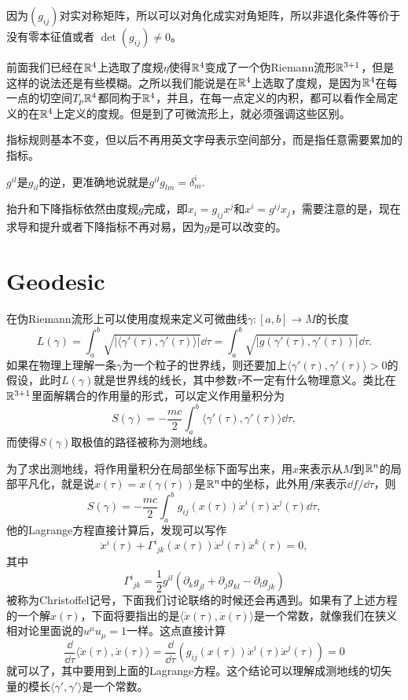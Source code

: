 因为$(g_{ij})$对实对称矩阵，所以可以对角化成实对角矩阵，所以非退化条件等价于没有零本征值或者
$\det (g_{ij})\neq 0$。

前面我们已经在$\mathbb{R}^4$上选取了度规$\eta$使得$\mathbb{R}^4$变成了一个伪Riemann流形$\mathbb{R}^{3+1}$，但是这样的说法还是有些模糊。之所以我们能说是在$\mathbb{R}^4$上选取了度规，是因为$\mathbb{R}^4$在每一点的切空间$T_p\mathbb{R}^4$都同构于$\mathbb{R}^4$，并且，在每一点定义的内积，都可以看作全局定义的在$\mathbb{R}^4$上定义的度规。但是到了可微流形上，就必须强调这些区别。

指标规则基本不变，但以后不再用英文字母表示空间部分，而是指任意需要累加的指标。

$g^{il}$是$g_{il}$的逆，更准确地说就是$g^{il}g_{lm}=\delta^i_m$.

抬升和下降指标依然由度规$g$完成，即$x_i=g_{ij}x^j$和$x^i=g^{ij}x_j$，需要注意的是，现在求导和提升或者下降指标不再对易，因为$g$是可以改变的。
\section{Geodesic}
在伪Riemann流形上可以使用度规来定义可微曲线$\gamma:[a,b]\to M$的长度
\[
	L(\gamma)=\int_a^b \sqrt{|\langle\gamma'(\tau),\gamma'(\tau)\rangle|}\dd \tau=\int_a^b \sqrt{|g(\gamma'(\tau),\gamma'(\tau))|}\dd \tau.
\]
如果在物理上理解一条$\gamma$为一个粒子的世界线，则还要加上$\langle\gamma'(\tau),\gamma'(\tau)\rangle>0$的假设，此时$L(\gamma)$就是世界线的线长，其中参数$\tau$不一定有什么物理意义。类比在$\mathbb{R}^{3+1}$里面解耦合的作用量的形式，可以定义作用量积分为
\[
	S(\gamma)=-\frac{mc}{2}\int_a^b \langle\gamma'(\tau),\gamma'(\tau)\rangle\dd \tau,
\]
而使得$S(\gamma)$取极值的路径被称为测地线。

为了求出测地线，将作用量积分在局部坐标下面写出来，用$x$来表示从$M$到$\mathbb{R}^n$的局部平凡化，就是说$x(\tau)=x(\gamma(\tau))$是$\mathbb{R}^n$中的坐标，此外用$\dot{f}$来表示$\dd f/\dd \tau$，则
\[
	S(\gamma)=-\frac{mc}{2}\int_a^b g_{ij}(x(\tau))\dot{x}^i(\tau)\dot{x}^j(\tau)\dd \tau,
\]
他的Lagrange方程直接计算后，发现可以写作
\[
	\ddot{x}^i(\tau)+\Gamma^i_{\phantom{i}jk}(x(\tau))\dot{x}^j(\tau)\dot{x}^k(\tau)=0,
\]
其中
\[
	\Gamma^i_{\phantom{i}jk}=\frac{1}{2}g^{il}(\partial_k g_{jl}+\partial_j g_{kl}-\partial_l g_{jk})
\]
被称为Christoffel记号，下面我们讨论联络的时候还会再遇到。如果有了上述方程的一个解$x(\tau)$，下面将要指出的是$\langle\dot{x}(\tau),\dot{x}(\tau)\rangle$是一个常数，就像我们在狭义相对论里面说的$u^\mu u_\mu=1$一样。这点直接计算
\[
	\frac{\dd}{\dd \tau}\langle\dot{x}(\tau),\dot{x}(\tau)\rangle=\frac{\dd}{\dd \tau}\left(g_{ij}(x(\tau))\dot{x}^i(\tau)\dot{x}^j(\tau)\right)=0
\]
就可以了，其中要用到上面的Lagrange方程。这个结论可以理解成测地线的切矢量的模长$\langle\gamma',\gamma'\rangle$是一个常数。

